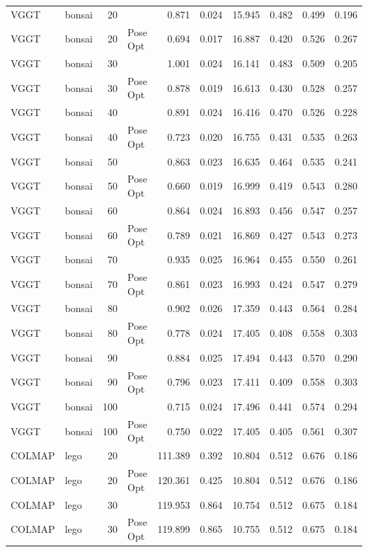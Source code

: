 \begin{table}[H]
\begin{tabular}{llrlrrrrrr}
VGGT & bonsai & 20 &  & 0.871 & 0.024 & 15.945 & 0.482 & 0.499 & 0.196 \\
VGGT & bonsai & 20 & Pose Opt & 0.694 & 0.017 & 16.887 & 0.420 & 0.526 & 0.267 \\
VGGT & bonsai & 30 &  & 1.001 & 0.024 & 16.141 & 0.483 & 0.509 & 0.205 \\
VGGT & bonsai & 30 & Pose Opt & 0.878 & 0.019 & 16.613 & 0.430 & 0.528 & 0.257 \\
VGGT & bonsai & 40 &  & 0.891 & 0.024 & 16.416 & 0.470 & 0.526 & 0.228 \\
VGGT & bonsai & 40 & Pose Opt & 0.723 & 0.020 & 16.755 & 0.431 & 0.535 & 0.263 \\
VGGT & bonsai & 50 &  & 0.863 & 0.023 & 16.635 & 0.464 & 0.535 & 0.241 \\
VGGT & bonsai & 50 & Pose Opt & 0.660 & 0.019 & 16.999 & 0.419 & 0.543 & 0.280 \\
VGGT & bonsai & 60 &  & 0.864 & 0.024 & 16.893 & 0.456 & 0.547 & 0.257 \\
VGGT & bonsai & 60 & Pose Opt & 0.789 & 0.021 & 16.869 & 0.427 & 0.543 & 0.273 \\
VGGT & bonsai & 70 &  & 0.935 & 0.025 & 16.964 & 0.455 & 0.550 & 0.261 \\
VGGT & bonsai & 70 & Pose Opt & 0.861 & 0.023 & 16.993 & 0.424 & 0.547 & 0.279 \\
VGGT & bonsai & 80 &  & 0.902 & 0.026 & 17.359 & 0.443 & 0.564 & 0.284 \\
VGGT & bonsai & 80 & Pose Opt & 0.778 & 0.024 & 17.405 & 0.408 & 0.558 & 0.303 \\
VGGT & bonsai & 90 &  & 0.884 & 0.025 & 17.494 & 0.443 & 0.570 & 0.290 \\
VGGT & bonsai & 90 & Pose Opt & 0.796 & 0.023 & 17.411 & 0.409 & 0.558 & 0.303 \\
VGGT & bonsai & 100 &  & 0.715 & 0.024 & 17.496 & 0.441 & 0.574 & 0.294 \\
VGGT & bonsai & 100 & Pose Opt & 0.750 & 0.022 & 17.405 & 0.405 & 0.561 & 0.307 \\
\midrule
COLMAP & lego & 20 &  & 111.389 & 0.392 & 10.804 & 0.512 & 0.676 & 0.186 \\
COLMAP & lego & 20 & Pose Opt & 120.361 & 0.425 & 10.804 & 0.512 & 0.676 & 0.186 \\
COLMAP & lego & 30 &  & 119.953 & 0.864 & 10.754 & 0.512 & 0.675 & 0.184 \\
COLMAP & lego & 30 & Pose Opt & 119.899 & 0.865 & 10.755 & 0.512 & 0.675 & 0.184 \\

\end{tabular}
\end{table}
